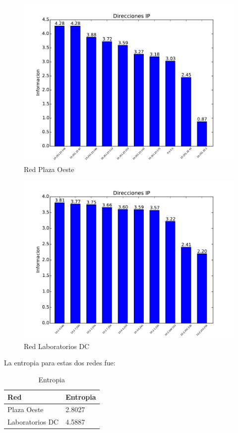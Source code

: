 \begin{figure}[H]
\begin{center}
\includegraphics[width=0.8\columnwidth]{graficos/plaza_parcial_inf_s2.pdf}
\caption{Red Plaza Oeste}
\end{center}
\end{figure}

\begin{figure}[H]
\begin{center}
\includegraphics[width=0.8\columnwidth]{graficos/dc_parcial_inf_s2.pdf}
\caption{Red Laboratorios DC}
\end{center}
\end{figure}

La entropia para estas dos redes fue:

\begin{table}[H]
\centering
\caption{Entropia}
\label{my-label}
\begin{tabular}{ll}
\hline
Red         & Entropia \\ \hline
Plaza Oeste & 2.8027   \\
Laboratorios DC    & 4.5887   \\ \hline
\end{tabular}
\end{table}

